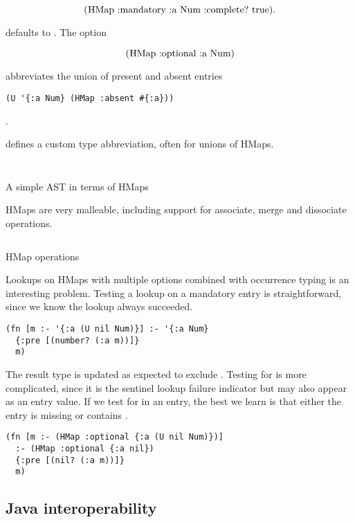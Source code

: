 $$
\clj{(HMap :mandatory {:a Num} :complete? true)}.
$$

 defaults to .
The  option 

$$
\clj{(HMap :optional {:a Num})}
$$

abbreviates the union of present and absent entries

\smallskip
\begin{verbatim}
(U '{:a Num} (HMap :absent #{:a}))
\end{verbatim}
.


 defines a custom type abbreviation, often for unions of HMaps.

\begin{listing}
\inputminted[firstline=5,lastline=8]{clojure}{code/demo/src/demo/hmap.clj}
\inputminted[firstline=26,lastline=28]{clojure}{code/demo/src/demo/hmap.clj}
\caption{A simple AST in terms of HMaps}
\end{listing}


HMaps are very malleable, including support for associate, merge and dissociate operations.

\begin{listing}
\inputminted[firstline=10,lastline=24]{clojure}{code/demo/src/demo/hmap.clj}
\caption{HMap operations}
\end{listing}

Lookups on HMaps with multiple options combined with
occurrence typing is an interesting problem.
Testing a lookup on a mandatory entry is straightforward, since we
know the lookup always succeeded.

\begin{verbatim}
(fn [m :- '{:a (U nil Num)}] :- '{:a Num}
  {:pre [(number? (:a m))]}
  m)
\end{verbatim}

The result type is updated as expected to exclude .
Testing for  is more complicated, since it is the sentinel
lookup failure indicator but may also appear as an entry value.
If we test for  in an  entry, the best we learn
is that either the entry is missing or contains .

\begin{verbatim}
(fn [m :- (HMap :optional {:a (U nil Num)})] 
  :- (HMap :optional {:a nil})
  {:pre [(nil? (:a m))]}
  m)
\end{verbatim}

\subsection{Java interoperability}

